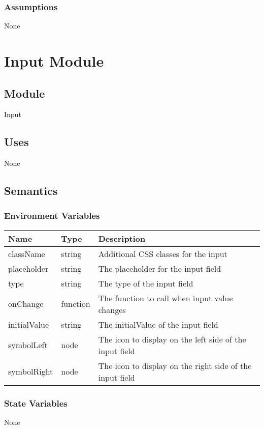 \documentclass[12pt]{article}
\begin{document}
\subsubsection{Assumptions}
None

\newpage

\section{Input Module}

\subsection{Module}
Input

\subsection{Uses}
None

\subsection{Semantics}

\subsubsection{Environment Variables}
\begin{tabular}{| l | l | p{10cm} |}
    \hline
    \textbf{Name} & \textbf{Type} & \textbf{Description}\\ \hline
    className & string & Additional CSS classes for the input\\ \hline
    placeholder & string & The placeholder for the input field\\ \hline
    type & string & The type of the input field\\ \hline
    onChange & function & The function to call when input value changes\\ \hline
    initialValue & string & The initialValue of the input field\\ \hline
    symbolLeft & node & The icon to display on the left side of the input field\\ \hline
    symbolRight & node & The icon to display on the right side of the input field\\ \hline
\end{tabular}

\subsubsection{State Variables}
None
\end{document}
